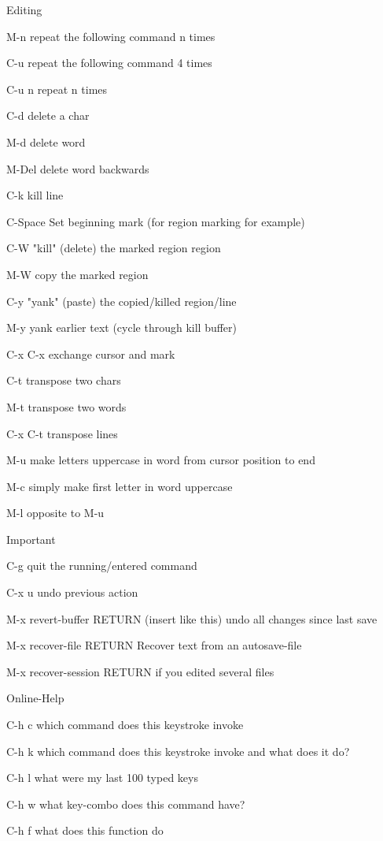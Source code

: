 \documentclass{article}
\begin{document}
Editing


M-n repeat the following command n times


C-u repeat the following command 4 times


C-u n repeat n times


C-d delete a char


M-d delete word


M-Del delete word backwards


C-k kill line



C-Space Set beginning mark (for region marking for example)


C-W "kill" (delete) the marked region region


M-W copy the marked region


C-y "yank" (paste) the copied/killed region/line


M-y yank earlier text (cycle through kill buffer)


C-x C-x exchange cursor and mark



C-t transpose two chars


M-t transpose two words


C-x C-t transpose lines


M-u make letters uppercase in word from cursor position to end


M-c simply make first letter in word uppercase


M-l opposite to M-u



Important


C-g quit the running/entered command


C-x u undo previous action


M-x revert-buffer RETURN (insert like this) undo all changes since last save


M-x recover-file RETURN Recover text from an autosave-file


M-x recover-session RETURN if you edited several files



Online-Help


C-h c which command does this keystroke invoke


C-h k which command does this keystroke invoke and what does it do?


C-h l what were my last 100 typed keys


C-h w what key-combo does this command have?


C-h f what does this function do
\end{document}
